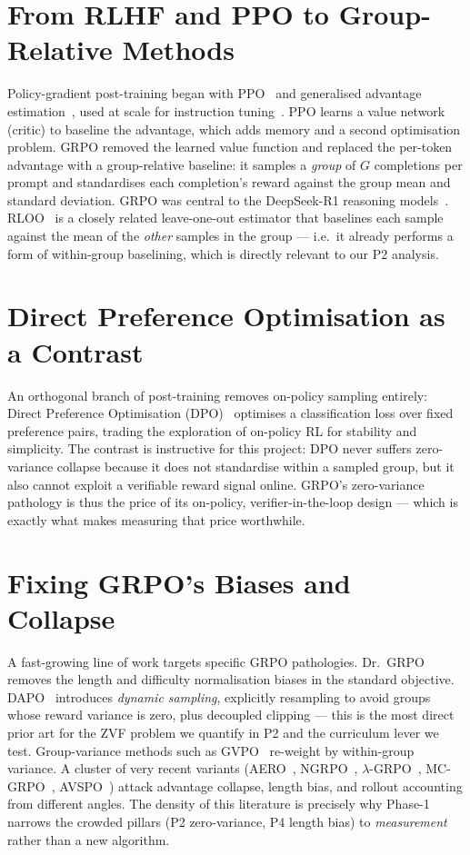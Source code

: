 \documentclass[12pt,a4paper]{report}
\begin{document}
\section{From RLHF and PPO to Group-Relative Methods}
Policy-gradient post-training began with PPO~\cite{schulman2017ppo} and generalised
advantage estimation~\cite{schulman2015gae}, used at scale for instruction
tuning~\cite{ouyang2022instructgpt}. PPO learns a value network (critic) to
baseline the advantage, which adds memory and a second optimisation problem. GRPO
\cite{shao2024deepseekmath} removed the learned value function and replaced the
per-token advantage with a group-relative baseline: it samples a \emph{group} of
$G$ completions per prompt and standardises each completion's reward against the
group mean and standard deviation. GRPO was central to the DeepSeek-R1 reasoning
models~\cite{guo2025r1}. RLOO~\cite{ahmadian2024rloo} is a closely related
leave-one-out estimator that baselines each sample against the mean of the
\emph{other} samples in the group --- i.e.\ it already performs a form of
within-group baselining, which is directly relevant to our P2 analysis.

\section{Direct Preference Optimisation as a Contrast}
An orthogonal branch of post-training removes on-policy sampling entirely: Direct
Preference Optimisation (DPO)~\cite{rafailov2023dpo} optimises a classification
loss over fixed preference pairs, trading the exploration of on-policy RL for
stability and simplicity. The contrast is instructive for this project: DPO never
suffers zero-variance collapse because it does not standardise within a sampled
group, but it also cannot exploit a verifiable reward signal online. GRPO's
zero-variance pathology is thus the price of its on-policy, verifier-in-the-loop
design --- which is exactly what makes measuring that price worthwhile.

\section{Fixing GRPO's Biases and Collapse}
A fast-growing line of work targets specific GRPO pathologies. Dr.\
GRPO~\cite{liu2025drgrpo} removes the length and difficulty normalisation biases in
the standard objective. DAPO~\cite{yu2025dapo} introduces \emph{dynamic sampling},
explicitly resampling to avoid groups whose reward variance is zero, plus decoupled
clipping --- this is the most direct prior art for the ZVF problem we quantify in
P2 and the curriculum lever we test. Group-variance methods such as
GVPO~\cite{gvpo2025} re-weight by within-group variance. A cluster of very recent
variants (AERO~\cite{aero2026}, NGRPO~\cite{ngrpo2025},
$\lambda$-GRPO~\cite{lambdagrpo2025}, MC-GRPO~\cite{mcgrpo2026},
AVSPO~\cite{avspo2026}) attack advantage collapse, length bias, and rollout
accounting from different angles. The density of this literature is precisely why
Phase-1 narrows the crowded pillars (P2 zero-variance, P4 length bias) to
\emph{measurement} rather than a new algorithm.
\end{document}
